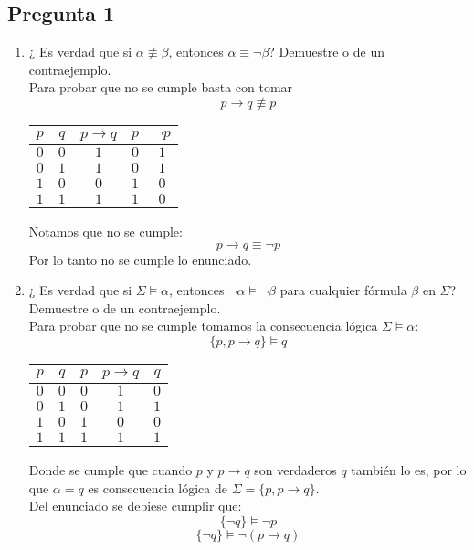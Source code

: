 \documentclass[letter]{article}
\begin{document}
	
	\begin{pregunta}{1} %
		\section*{Pregunta 1}
		\begin{enumerate}
		\item ¿ Es verdad que si $\alpha \not\equiv \beta$, entonces $\alpha \equiv \neg \beta$? Demuestre o de un contraejemplo.\\
		Para probar que no se cumple basta con tomar 
		$$p\rightarrow q \not \equiv p $$
		\begin{center}
		\begin{tabular}{c c|c c c}
		$p$& $q$ & $p \rightarrow q $& $p$&$\neg p$\\
		\hline
		$0$ &$0$ & $1$&$0$&$1$\\
		$0$ &$1$ & $1$&$0$&$1$\\
		$1$ &$0$ & $0$&$1$&$0$\\
		$1$ &$1$ & $1$&$1$&$0$\\
		\end{tabular}
		\end{center}
		Notamos que no se cumple:
		$$p\rightarrow q \equiv \neg p $$
		Por lo tanto no se cumple lo enunciado.
		\item ¿ Es verdad que si $\Sigma \vDash \alpha$, entonces $\neg \alpha \vDash \neg \beta$ para cualquier fórmula $\beta$ en $\Sigma$? Demuestre o de un contraejemplo.\\
		Para probar que no se cumple tomamos la consecuencia lógica $\Sigma \vDash \alpha$:
		$$\{p,p \rightarrow q\} \vDash q$$
		\begin{center}
		\begin{tabular}{c c|c c|c}
		$p$&$q$&$p$&$p\rightarrow q$&$q$ \\
		\hline
		$0$&$0$&$0$&$1$&$0$\\
		$0$&$1$&$0$&$1$&$1$\\
		$1$&$0$&$1$&$0$&$0$\\
		$1$&$1$&$1$&$1$&$1$\\
		\end{tabular}
		\end{center}
		Donde se cumple que cuando $p$ y $p\rightarrow q$ son verdaderos $q$ también lo es, por lo que $\alpha= q$ es consecuencia lógica de $\Sigma=\{p,p \rightarrow q\}$.\\
		Del enunciado se debiese cumplir que:
		$$\{\neg q\} \vDash \neg p$$
		$$\{\neg q\} \vDash \neg(p\rightarrow q)$$

\end{enumerate}
\end{pregunta}
\end{document}
